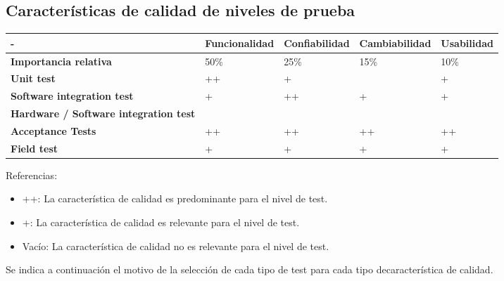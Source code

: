 \documentclass[
  11pt, %
  codirector, %
]{charter}
\begin{document}
\subsection{Características de calidad de niveles de prueba}
\label{sec:caracteristicas_de_calidad_niveles_de_prueba}

\begin{table}[h!]
	\centering
	\begin{tabular}{ | m{3cm} | m{2.7cm} | m{2.5cm} | m{2.7cm} | m{2.5cm} | }
		\hline
		\rowcolor{gray!50} %
		\textbf{-} & \textbf{Funcionalidad} & \textbf{Confiabilidad} & \textbf{Cambiabilidad} & \textbf{Usabilidad} \\ \hline
    \textbf{Importancia relativa} & 50\% & 25\% & 15\% & 10\%  \\ \hline
    \textbf{Unit test} & ++ & + &  & +  \\ \hline
    \textbf{Software integration test} & + & ++ & + & +  \\ \hline
    \textbf{Hardware / Software integration test} &  &  &  &   \\ \hline
    \textbf{Acceptance Tests} & ++ & ++ & ++ & ++  \\ \hline
    \textbf{Field test} & + & + & + & +
    \\ \hline
	\end{tabular}

\end{table}

Referencias:
\begin{itemize}
\item ++: La característica de calidad es predominante para el nivel de test.
\item +: La característica de calidad es relevante para el nivel de test.
\item Vacío: La característica de calidad no es relevante para el nivel de test.
\end{itemize}

Se indica a continuación el motivo de la selección de cada tipo de test para cada tipo decaracterística de calidad.
\end{document}
